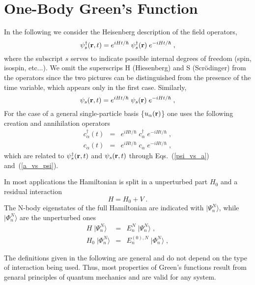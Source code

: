 \section{One-Body Green's Function}

In the following we consider the Heisenberg description of the field operators,
\begin{equation}
\psi^\dag_s({\bf r}, t) = e^{iHt/\hbar}  \; \psi^\dag_s({\bf r})  \; e^{-iHt/\hbar} \; ,
\label{psiH+}
\end{equation}
where the subscript $s$ serves to indicate possible internal degrees of freedom (spin, isospin, etc...).
We omit the superscrips H (Hiesenberg) and S (Scr\"odinger) from the operators since the two pictures can be distinguished from the presence of the time variable, which appears only in the first case.
Similarly,
\begin{equation}
\psi_s({\bf r}, t) = e^{iHt/\hbar}  \; \psi_s({\bf r}) \;  e^{-iHt/\hbar} \; ,
\label{psiH-}
\end{equation}
For the case of a general single-particle basis \{$u_\alpha({\bf r})$\} one uses the following creation and annihilation operators
\begin{eqnarray}
c^\dag_\alpha(t) &=& e^{iHt/\hbar}  \; c^\dag_\alpha  \; e^{-iHt/\hbar} \; ,
\label{cH+}
\\
c_\alpha(t)      &=& e^{iHt/\hbar}  \; c_\alpha  \; e^{-iHt/\hbar} \; ,
\label{cH-}
\end{eqnarray}
which are related to $\psi^\dag_s({\bf r}, t)$ and $\psi_s({\bf r}, t)$ through Eqs.~(\ref{psi_vs_a}) and~(\ref{a_vs_psi}).

In most applications the Hamiltonian is split in a unperturbed part $H_0$ and a residual interaction
\begin{equation}
 H = H_0 + V\; .
\end{equation}
The N-body eigenstates of the full Hamiltonian are indicated with $\vert\Psi^N_n\rangle$, while $\vert\Phi^N_n\rangle$ are the unperturbed ones
\begin{eqnarray}
 H \; \vert \Psi^N_n \rangle &=& E^N_n \; \vert \Psi^N_n \rangle \; ,
\label{DefPsi}
\\
 H_0 \; \vert \Phi^N_n \rangle &=& E^{(0),N}_n \; \vert \Phi^N_n \rangle \; ,
\label{DefPhi}
\end{eqnarray}


The definitions given in the following are general and do not depend on the type of interaction being used. Thus, most properties of Green's functions result from genaral principles of quantum mechanics and are valid for any system.


